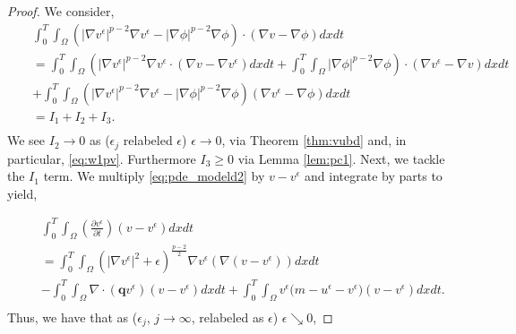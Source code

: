 \documentclass[10pt]{amsart}
\theoremstyle{plain}
\theoremstyle{definition}
\begin{document}
\begin{proof}
We consider,
\begin{eqnarray}
\label{eq:i1i}
&& \int^{T}_{0}\int_{\Omega} ( |\nabla v^{\epsilon}|^{p-2} \nabla v^{\epsilon}  - |\nabla \phi|^{p-2} \nabla \phi  ) \cdot (\nabla v - \nabla \phi )dx dt \nonumber \\
    && = \int^{T}_{0}\int_{\Omega} ( |\nabla v^{\epsilon}|^{p-2} \nabla v^{\epsilon} \cdot (\nabla v - \nabla v^{\epsilon})dxdt
    +\int^{T}_{0}\int_{\Omega}|\nabla \phi|^{p-2} \nabla \phi  ) \cdot (\nabla v^{\epsilon} - \nabla v)dxdt \nonumber \\
    && + \int^{T}_{0}\int_{\Omega} ( |\nabla v^{\epsilon}|^{p-2} \nabla v^{\epsilon}  - |\nabla \phi|^{p-2} \nabla \phi  ) (\nabla v^{\epsilon} - \nabla \phi)dxdt\nonumber \\
    && = I_{1} + I_{2} + I_{3} .\nonumber \\
\end{eqnarray}
    We see $I_{2} \rightarrow 0$ as ($\epsilon_{j}$ relabeled $\epsilon$) $\epsilon \rightarrow 0$, via Theorem \ref{thm:vubd} and, in particular, \eqref{eq:w1pv}. Furthermore $I_{3} \geq 0$ via Lemma \ref{lem:pc1}. Next, we tackle the $I_{1}$ term. We multiply \eqref{eq:pde_modeld2} by $v-v^{\epsilon}$ and integrate by parts to yield,

    

\begin{eqnarray}
&& \int^{T}_{0}\int_{\Omega} \left( \frac{\partial v^{\epsilon}}{\partial t}  \right) ( v -  v^{\epsilon} )dx dt \nonumber \\
&& = \int^{T}_{0}\int_{\Omega} ( |\nabla v^{\epsilon}|^{2}  + \epsilon )^{\frac{p-2}{2}} \nabla v^{\epsilon}  ( \nabla (v -   v^{\epsilon}) )dx dt \nonumber \\
&& - \int^{T}_{0}\int_{\Omega} \nabla\cdot (\textbf{q}  v^{\epsilon}) ( v -  v^{\epsilon} )dx dt
+\int^{T}_{0}\int_{\Omega} v^{\epsilon}\Big(m-u^{\epsilon}-v^{\epsilon}\Big) ( v -  v^{\epsilon} )dx dt. \nonumber \\
\end{eqnarray}
%
     Thus, we have that as ($\epsilon_{j}$, $j \rightarrow \infty$, relabeled as $\epsilon$) $\epsilon \searrow 0$,


\end{proof}
\end{document}
